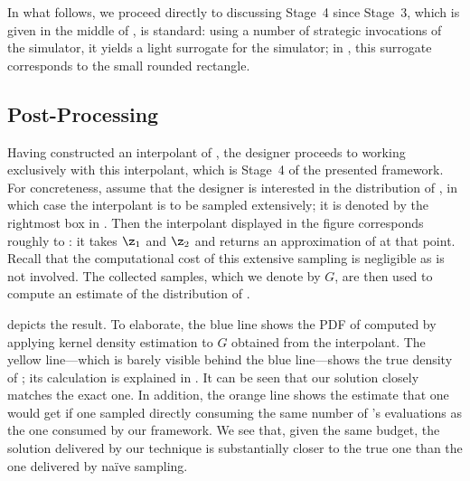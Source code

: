 In what follows, we proceed directly to discussing Stage~4 since Stage~3, which
is given in the middle of , is standard: using a number
of strategic invocations of the simulator, it yields a light surrogate for the
simulator; in , this surrogate corresponds to the small
rounded rectangle.

\subsection{Post-Processing}

Having constructed an interpolant of \g, the designer proceeds to working
exclusively with this interpolant, which is Stage~4 of the presented framework.
For concreteness, assume that the designer is interested in the distribution of
\g, in which case the interpolant is to be sampled extensively; it is denoted by
the rightmost box in . Then the interpolant displayed in
the figure corresponds roughly to : it takes $\z_1$ and
$\z_2$ and returns an approximation of \g at that point. Recall that the
computational cost of this extensive sampling is negligible as \g is not
involved. The collected samples, which we denote by $G$, are then used to
compute an estimate of the distribution of \g.

 depicts the result. To elaborate, the blue line shows the
\ac{PDF} of \g computed by applying kernel density estimation to $G$ obtained
from the interpolant. The yellow line---which is barely visible behind the blue
line---shows the true density of \g; its calculation is explained in
. It can be seen that our solution closely matches the exact
one. In addition, the orange line shows the estimate that one would get if one
sampled \g directly consuming the same number of \g's evaluations as the one
consumed by our framework. We see that, given the same budget, the solution
delivered by our technique is substantially closer to the true one than the one
delivered by naïve sampling.
